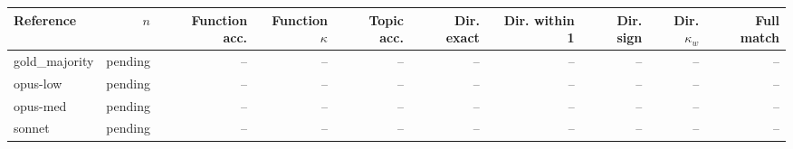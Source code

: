 \begin{tabular}{lrrrrrrrrr}
\toprule
Reference & $n$ & Function acc. & Function $\kappa$ & Topic acc. & Dir. exact & Dir. within 1 & Dir. sign & Dir. $\kappa_w$ & Full match \\
\midrule
gold\_majority & pending & -- & -- & -- & -- & -- & -- & -- & -- \\
opus-low & pending & -- & -- & -- & -- & -- & -- & -- & -- \\
opus-med & pending & -- & -- & -- & -- & -- & -- & -- & -- \\
sonnet & pending & -- & -- & -- & -- & -- & -- & -- & -- \\
\bottomrule
\end{tabular}
